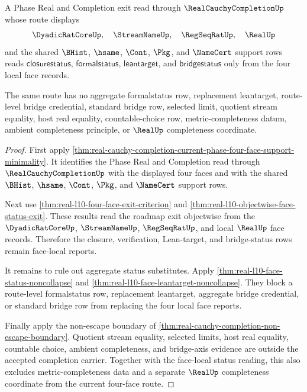\begin{theorem}
\label{thm:real-cauchy-completion-four-face-status-noncollapse}
A Phase Real and Completion exit read through $\RealCauchyCompletionUp$ whose route displays
$$
\DyadicRatCoreUp,\quad \StreamNameUp,\quad \RegSeqRatUp,\quad \RealUp
$$
and the shared $\BHist$, $\hsame$, $\Cont$, $\Pkg$, and $\NameCert$ support rows reads $\mathsf{closurestatus}$, $\mathsf{formalstatus}$, $\mathsf{leantarget}$, and $\mathsf{bridgestatus}$ only from the four local face records.

The same route has no aggregate formalstatus row, replacement leantarget, route-level bridge credential, standard bridge row, selected limit, quotient stream equality, host real equality, countable-choice row, metric-completeness datum, ambient completeness principle, or $\RealUp$ completeness coordinate.
\end{theorem}
\begin{proof}
First apply \autoref{thm:real-cauchy-completion-current-phase-four-face-support-minimality}. It identifies the Phase Real and Completion read through $\RealCauchyCompletionUp$ with the displayed four faces and with the shared $\BHist$, $\hsame$, $\Cont$, $\Pkg$, and $\NameCert$ support rows.

Next use \autoref{thm:real-l10-four-face-exit-criterion} and \autoref{thm:real-l10-objectwise-face-status-exit}. These results read the roadmap exit objectwise from the $\DyadicRatCoreUp$, $\StreamNameUp$, $\RegSeqRatUp$, and local $\RealUp$ face records. Therefore the closure, verification, Lean-target, and bridge-status rows remain face-local reports.

It remains to rule out aggregate status substitutes. Apply \autoref{thm:real-l10-face-status-noncollapse} and \autoref{thm:real-l10-face-leantarget-noncollapse}. They block a route-level formalstatus row, replacement leantarget, aggregate bridge credential, or standard bridge row from replacing the four local face reports.

Finally apply the non-escape boundary of \autoref{thm:real-cauchy-completion-non-escape-boundary}. Quotient stream equality, selected limits, host real equality, countable choice, ambient completeness, and bridge-axis evidence are outside the accepted completion carrier. Together with the face-local status reading, this also excludes metric-completeness data and a separate $\RealUp$ completeness coordinate from the current four-face route.
\end{proof}

